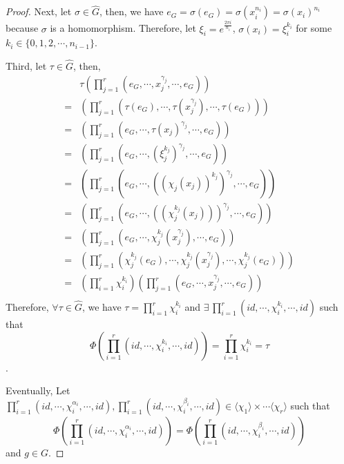 \begin{answer}
\begin{proof}
        Next, let $\sigma \in \hat{G}$, then, we have $e_G = \sigma(e_{G}) = \sigma(x_i^{n_i}) = \sigma(x_i)^{n_i}$ because $\sigma$ is a homomorphism. Therefore, let $\xi_i = e^{\frac{2\pi i}{n_i}}$, $\sigma(x_i) = \xi_i^{k_i}$ for some $k_i \in \{0,1,2,\cdots,n_{i-1}\}$.
        
        Third, let $\tau \in \hat{G}$, then,
        \begin{equation}
            \begin{aligned}
                &\tau\left(\prod_{j = 1}^{r}(e_G,\cdots,x_j^{\gamma_j},\cdots,e_G)\right)\\
                = &\left(\prod_{j = 1}^{r}(\tau(e_G),\cdots,\tau(x_j^{\gamma_j}),\cdots,\tau(e_G))\right)\\
                = &\left(\prod_{j = 1}^{r}(e_G,\cdots,\tau(x_j)^{\gamma_j},\cdots,e_G)\right)\\
                = &\left(\prod_{j = 1}^{r}(e_G,\cdots,(\xi_j^{k_j})^{\gamma_j},\cdots,e_G)\right)\\
                = &\left(\prod_{j = 1}^{r}(e_G,\cdots,((\chi_j(x_j))^{k_j})^{\gamma_j},\cdots,e_G)\right)\\
                = &\left(\prod_{j = 1}^{r}(e_G,\cdots,((\chi_j^{k_j}(x_j)))^{\gamma_j},\cdots,e_G)\right)\\
                = &\left(\prod_{j = 1}^{r}(e_G,\cdots,\chi_j^{k_j}(x_j^{\gamma_j}),\cdots,e_G)\right)\\
                = &\left(\prod_{j = 1}^{r}(\chi_j^{k_j}(e_G),\cdots,\chi_j^{k_j}(x_j^{\gamma_j}),\cdots,\chi_j^{k_j}(e_G))\right)\\
                = &\left(\prod_{i=1}^{r}\chi_i^{k_i}\right)\left(\prod_{j = 1}^{r}(e_G,\cdots,x_j^{\gamma_j},\cdots,e_G)\right)\\
            \end{aligned}
        \end{equation}
        Therefore, $\forall \tau \in \hat{G}$, we have $\tau = \prod_{i = 1}^r\chi_i^{k_i}$ and $\exists \, \prod_{i = 1}^{r}(id,\cdots,\chi_i^{k_i},\cdots,id)$ such that 
        $$\Phi\left(\prod_{i = 1}^{r}(id,\cdots,\chi_i^{k_i},\cdots,id)\right) = \prod_{i = 1}^r\chi_i^{k_i} = \tau$$.
        
        Eventually, Let $\prod_{i = 1}^r(id,\cdots, \chi_i^{\alpha_i}, \cdots, id),\prod_{i = 1}^r(id,\cdots, \chi_i^{\beta_i}, \cdots, id) \in \langle \chi_1 \rangle \times \cdots \langle \chi_r \rangle$ such that $$\Phi\left(\prod_{i = 1}^r(id,\cdots, \chi_i^{\alpha_i}, \cdots, id)\right) = \Phi\left(\prod_{i = 1}^r(id,\cdots, \chi_i^{\beta_i}, \cdots, id)\right)$$ and $g \in G$.
        

\end{proof}
\end{answer}
